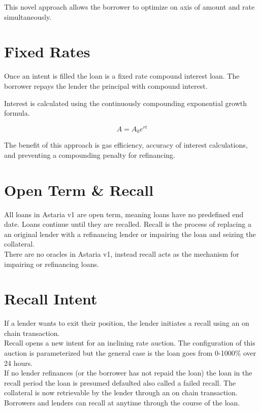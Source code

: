 \documentclass[12pt]{article}
\begin{document}
This novel approach allows the borrower to optimize on axis of amount and rate simultaneously. 

\section{Fixed Rates}
Once an intent is filled the loan is a fixed rate compound interest loan. The borrower repays the lender the principal with compound interest.

Interest is calculated using the continuously compounding exponential growth formula.

$$
A = A_0e^{rt}
$$

The benefit of this approach is gas efficiency, accuracy of interest calculations, and preventing a compounding penalty for refinancing.

\section{Open Term \& Recall}
All loans in Astaria v1 are open term, meaning loans have no predefined end date. Loans continue until they are recalled. Recall is the process of replacing a an original lender with a refinancing lender or impairing the loan and seizing the collateral.\\

There are no oracles in Astaria v1, instead recall acts as the mechanism for impairing or refinancing loans.

\section{Recall Intent}
If a lender wants to exit their position, the lender initiates a recall using an on chain transaction.\\

Recall opens a new intent for an inclining rate auction. The configuration of this auction is parameterized but the general case is the loan goes from 0-1000\% over 24 hours.\\

If no lender refinances (or the borrower has not repaid the loan) the loan in the recall period the loan is presumed defaulted also called a failed recall. The collateral is now retrievable by the lender through an on chain transaction.\\

Borrowers and lenders can recall at anytime through the course of the loan.\\
\end{document}
